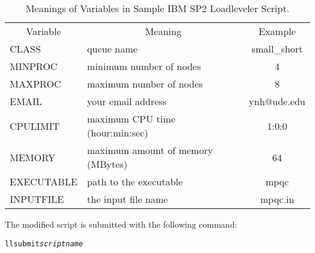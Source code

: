 \begin{table}
\caption{Meanings of Variables in Sample IBM SP2 Loadleveler Script.}
\begin{center}
\begin{tabular}{lp{2.5in}c}
  \multicolumn{1}{c}{Variable}
     & \multicolumn{1}{c}{Meaning}
     & \multicolumn{1}{c}{Example} \\
  CLASS & queue name & small\_short \\
  MINPROC & minimum number of nodes & 4 \\
  MAXPROC & maximum number of nodes & 8 \\
  EMAIL & your email address & ynh@ude.edu \\
  CPULIMIT & maximum CPU time (hour:min:sec) & 1:0:0 \\
  MEMORY & maximum amount of memory (MBytes) & 64 \\
  EXECUTABLE & path to the executable & mpqc \\
  INPUTFILE & the input file name & mpqc.in \\
\end{tabular}
\end{center}
\label{runningspvariables}
\end{table}

The modified script is submitted with the following command:

\begin{alltt}
llsubmit {\itshape scriptname}
\end{alltt}

